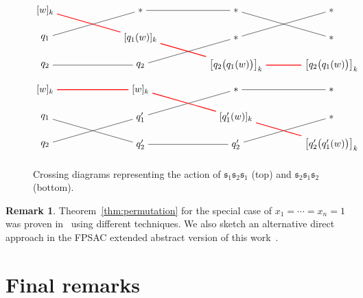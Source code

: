 \documentclass[reqno]{amsart}
\newcommand{\0}{\phantom{c}}
\newcommand{\fraks}{\mathfrak{s}}
\theoremstyle{plain}
\theoremstyle{definition}
\newtheorem{remark}[thm]{Remark}
\numberwithin{equation}{section}
\begin{document}
\begin{figure}
\begin{gather*}
\begin{tikzpicture}[xscale=3.5]
\node (i1) at (0,0) {$[w]_k$};
\node (i2) at (0,-1) {$q_1$};
\node (i3) at (0,-2) {$q_2$};
\node (s11) at (1,0) {$\ast$};
\node (s12) at (1,-1) {$[q_1(w)]_k$};
\node (s13) at (1,-2) {$q_2$};
\node (s21) at (2,0) {$\ast$};
\node (s22) at (2,-1) {$\ast$};
\node (s23) at (2,-2) {$\bigl[ q_2\bigl( q_1(w) \bigr) \bigr]_k$};
\node (t1) at (3,0) {$\ast$};
\node (t2) at (3,-1) {$\ast$};
\node (t3) at (3,-2) {$\bigl[ q_2\bigl( q_1(w) \bigr) \bigr]_k$};
\path[-] (i2) edge (s11) (s11) edge (s21) (s21) edge (t2);
\path[-] (i3) edge (s13) (s13) edge (s22) (s22) edge (t1);
\path[-,red,thick] (i1) edge (s12) (s12) edge (s23) (s23) edge (t3);
\end{tikzpicture}
\\
\begin{tikzpicture}[xscale=3.5]
\node (i1) at (0,0) {$[w]_k$};
\node (i2) at (0,-1) {$q_1$};
\node (i3) at (0,-2) {$q_2$};
\node (s11) at (1,0) {$[w]_k$};
\node (s12) at (1,-1) {$q'_1$};
\node (s13) at (1,-2) {$q'_2$};
\node (s21) at (2,0) {$\ast$};
\node (s22) at (2,-1) {$[q'_1(w)]_k$};
\node (s23) at (2,-2) {$q'_2$};
\node (t1) at (3,0) {$\ast$};
\node (t2) at (3,-1) {$\ast$};
\node (t3) at (3,-2) {$\bigl[ q'_2\bigl( q'_1(w) \bigr) \bigr]_k$};
\path[-] (i2) edge (s13) (s13) edge (s23) (s23) edge (t2);
\path[-] (i3) edge (s12) (s12) edge (s21) (s21) edge (t1);
\path[-,red,thick] (i1) edge (s11) (s11) edge (s22) (s22) edge (t3);
\end{tikzpicture}
\end{gather*}
\caption{Crossing diagrams representing the action of $\fraks_1 \fraks_2 \fraks_1$ (top) and $\fraks_2 \fraks_1 \fraks_2$ (bottom).}
\label{fig:crossing_diagrams}
\end{figure}

\begin{remark}
Theorem~\ref{thm:permutation} for the special case of $x_1 = \cdots = x_n = 1$ was proven in~\cite{AAMP} using different techniques.
We also sketch an alternative direct approach in the FPSAC extended abstract version of this work~\cite{AGS18}.
\end{remark}






\section{Final remarks}
\label{sec:remarks}
\end{document}
